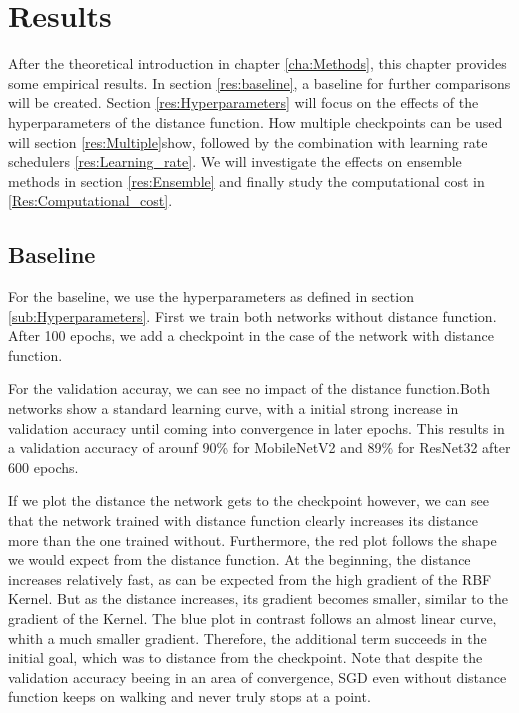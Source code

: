 \chapter{Results}
After the theoretical introduction in chapter \ref{cha:Methods}, this chapter
provides some empirical results. In section \ref{res:baseline}, a baseline for
further comparisons will be created. Section \ref{res:Hyperparameters} will
focus on the effects of the hyperparameters of the distance function. How
multiple checkpoints can be used will section \ref{res:Multiple}show, followed
by the combination with learning rate schedulers \ref{res:Learning_rate}. We
will investigate the effects on ensemble methods in section \ref{res:Ensemble}
and finally study the computational cost in \ref{Res:Computational_cost}.



\section{Baseline}\label{res:Baseline} For the baseline, we use the
hyperparameters as defined in section \ref{sub:Hyperparameters}. First we train
both networks without distance function. After 100 epochs, we add a checkpoint
in the case of the network with distance function.

For the validation accuray, we can see no impact of the distance function.Both
networks show a standard learning curve, with a initial strong increase in
validation accuracy until coming into convergence in later epochs. This results
in a validation accuracy of arounf 90\% for MobileNetV2 and 89\% for ResNet32
after 600 epochs.



If we plot the distance the network gets to the checkpoint however, we can see
that the network trained with distance function clearly increases its distance
more than the one trained without. Furthermore, the red plot follows the shape
we would expect from the distance function. At the beginning, the distance
increases relatively fast, as can be expected from the high gradient of the RBF
Kernel. But as the distance increases, its gradient becomes smaller, similar to
the gradient of the Kernel. The blue plot in contrast follows an almost linear
curve, whith a much smaller gradient. Therefore, the additional term succeeds in
the initial goal, which was to distance from the checkpoint. Note that despite
the validation accuracy beeing in an area of convergence, SGD even without
distance function keeps on walking and never truly stops at a point.

